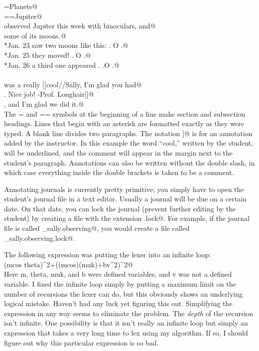\documentclass{doc}
\begin{document}
\verb@=Planets@\\
\verb@==Jupiter@\\
\verb@I observed Jupiter this week with binoculars, and@\\
\verb@saw some of its moons.@\\
\verb@*Jan. 23       saw two moons like this:    .   O .@\\
\verb@*Jan. 25       they moved!                .    O  .@\\
\verb@*Jan. 26       a third one appeared       .   .O   .@\\
\verb@@\\
\verb@This was a really [[cool//Sally, I'm glad you had@\\
\verb@fun. Nice job! -Prof. Longhair]]@\\
\verb@project, and I'm glad we did it.@\\

The = and == symbols at the beginning of a line make section and subsection headings.
Lines that begin with an asterisk are formatted exactly as they were typed. A blank
line divides two paragraphs. The notation \verb@[[ // ]]@ is for an annotation added by the
instructor. In this example the word ``cool,'' written by the student, will be underlined, and the
comment will appear in the margin next to the student's paragraph. Annotations can also be
written without the double slash, in which case everything inside the double brackets is
taken to be a comment.

Annotating journals is currently pretty primitive; you simply have to open the
student's journal file in a text editor.
Usually a journal will be due on a certain date. On that date, you can lock the
journal (prevent further editing by the student)
by creating a file with the extension \verb@.lock@. For example, if the
journal file is called \verb@jones_sally.observing@, you would create a file
called \verb@jones_sally.observing.lock@.

\label{bugs}
The following expression was putting the lexer into an infinite loop:\\
\verb@(mcos theta)^2+((mcos)(muk)+bv^2)^2@\\
Here m, theta, muk, and b were
defined variables, and v was not a defined variable. I fixed the infinite
loop simply by putting a maximum limit on the number of recursions the lexer
can do, but this obviously shows an underlying logical mistake. Haven't had
any luck yet figuring this out. Simplifying the expression in any way seems
to eliminate the problem. The \emph{depth} of the recursion isn't infinite.
One possibility is that it isn't really an infinite loop but simply an expression
that takes a very long time to lex using my algorithm. If so, I should figure
out why this particular expression is so bad.
\end{document}
